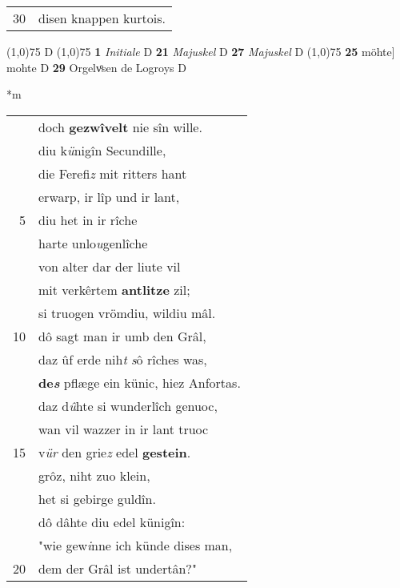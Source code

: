 \documentclass[8pt,a4paper,notitlepage]{article}
\begin{document}
\begin{table}[ht]
\begin{minipage}[t]{0.5\linewidth}
\begin{tabular}{rl}
30 & disen knappen kurtois.\\ 
\end{tabular}
\scriptsize
\line(1,0){75} \newline
D \newline
\line(1,0){75} \newline
\textbf{1} \textit{Initiale} D  \textbf{21} \textit{Majuskel} D  \textbf{27} \textit{Majuskel} D  \newline
\line(1,0){75} \newline
\textbf{25} möhte] mohte D \textbf{29} Orgelvͦsen de Logroys D \newline
\end{minipage}
\hspace{0.5cm}
\begin{minipage}[t]{0.5\linewidth}
\small
\begin{center}*m
\end{center}
\begin{tabular}{rl}
 & doch \textbf{gezwîvelt} nie sîn wille.\\ 
 & diu k\textit{ü}nigîn Secundille,\\ 
 & die Ferefi\textit{z} mit ritters hant\\ 
 & erwarp, ir lîp und ir lant,\\ 
5 & diu het in ir rîche\\ 
 & harte unlo\textit{u}genlîche\\ 
 & von alter dar der liute vil\\ 
 & mit verkêrtem \textbf{antlitze} zil;\\ 
 & si truogen vrömdiu, wildiu mâl.\\ 
10 & dô sagt man ir umb den Grâl,\\ 
 & daz ûf erde nih\textit{t} \textit{s}ô rîches was,\\ 
 & \textbf{de\textit{s}} pflæge ein künic, hiez Anfortas.\\ 
 & daz d\textit{û}hte si wunderlîch genuoc,\\ 
 & wan vil wazzer in ir lant truoc\\ 
15 & v\textit{ür} den grie\textit{z} edel \textbf{gestein}.\\ 
 & grôz, niht zuo klein,\\ 
 & het si gebirge guldîn.\\ 
 & dô dâhte diu edel künigîn:\\ 
 & "wie gew\textit{i}nne ich künde dises man,\\ 
20 & dem der Grâl ist undertân?"\\ 

\end{tabular}
\end{minipage}
\end{table}
\end{document}
